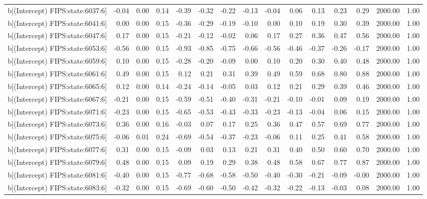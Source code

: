 \begin{table}[ht]
\begin{tabular}{rrrrrrrrrrrrrrr}
  b[(Intercept) FIPS:state:6037:6] & -0.04 & 0.00 & 0.14 & -0.39 & -0.32 & -0.22 & -0.13 & -0.04 & 0.06 & 0.13 & 0.23 & 0.29 & 2000.00 & 1.00 \\ 
  b[(Intercept) FIPS:state:6041:6] & 0.00 & 0.00 & 0.15 & -0.36 & -0.29 & -0.19 & -0.10 & 0.00 & 0.10 & 0.19 & 0.30 & 0.39 & 2000.00 & 1.00 \\ 
  b[(Intercept) FIPS:state:6047:6] & 0.17 & 0.00 & 0.15 & -0.21 & -0.12 & -0.02 & 0.06 & 0.17 & 0.27 & 0.36 & 0.47 & 0.56 & 2000.00 & 1.00 \\ 
  b[(Intercept) FIPS:state:6053:6] & -0.56 & 0.00 & 0.15 & -0.93 & -0.85 & -0.75 & -0.66 & -0.56 & -0.46 & -0.37 & -0.26 & -0.17 & 2000.00 & 1.00 \\ 
  b[(Intercept) FIPS:state:6059:6] & 0.10 & 0.00 & 0.15 & -0.28 & -0.20 & -0.09 & 0.00 & 0.10 & 0.20 & 0.30 & 0.40 & 0.48 & 2000.00 & 1.00 \\ 
  b[(Intercept) FIPS:state:6061:6] & 0.49 & 0.00 & 0.15 & 0.12 & 0.21 & 0.31 & 0.39 & 0.49 & 0.59 & 0.68 & 0.80 & 0.88 & 2000.00 & 1.00 \\ 
  b[(Intercept) FIPS:state:6065:6] & 0.12 & 0.00 & 0.14 & -0.24 & -0.14 & -0.05 & 0.03 & 0.12 & 0.21 & 0.29 & 0.39 & 0.46 & 2000.00 & 1.00 \\ 
  b[(Intercept) FIPS:state:6067:6] & -0.21 & 0.00 & 0.15 & -0.59 & -0.51 & -0.40 & -0.31 & -0.21 & -0.10 & -0.01 & 0.09 & 0.19 & 2000.00 & 1.00 \\ 
  b[(Intercept) FIPS:state:6071:6] & -0.23 & 0.00 & 0.15 & -0.65 & -0.53 & -0.43 & -0.33 & -0.23 & -0.13 & -0.04 & 0.06 & 0.15 & 2000.00 & 1.00 \\ 
  b[(Intercept) FIPS:state:6073:6] & 0.36 & 0.00 & 0.16 & -0.03 & 0.07 & 0.17 & 0.25 & 0.36 & 0.47 & 0.57 & 0.69 & 0.77 & 2000.00 & 1.00 \\ 
  b[(Intercept) FIPS:state:6075:6] & -0.06 & 0.01 & 0.24 & -0.69 & -0.54 & -0.37 & -0.23 & -0.06 & 0.11 & 0.25 & 0.41 & 0.58 & 2000.00 & 1.00 \\ 
  b[(Intercept) FIPS:state:6077:6] & 0.31 & 0.00 & 0.15 & -0.09 & 0.03 & 0.13 & 0.21 & 0.31 & 0.40 & 0.50 & 0.60 & 0.70 & 2000.00 & 1.00 \\ 
  b[(Intercept) FIPS:state:6079:6] & 0.48 & 0.00 & 0.15 & 0.09 & 0.19 & 0.29 & 0.38 & 0.48 & 0.58 & 0.67 & 0.77 & 0.87 & 2000.00 & 1.00 \\ 
  b[(Intercept) FIPS:state:6081:6] & -0.40 & 0.00 & 0.15 & -0.77 & -0.68 & -0.58 & -0.50 & -0.40 & -0.30 & -0.21 & -0.09 & -0.00 & 2000.00 & 1.00 \\ 
  b[(Intercept) FIPS:state:6083:6] & -0.32 & 0.00 & 0.15 & -0.69 & -0.60 & -0.50 & -0.42 & -0.32 & -0.22 & -0.13 & -0.03 & 0.08 & 2000.00 & 1.00 \\ 

\end{tabular}
\end{table}

